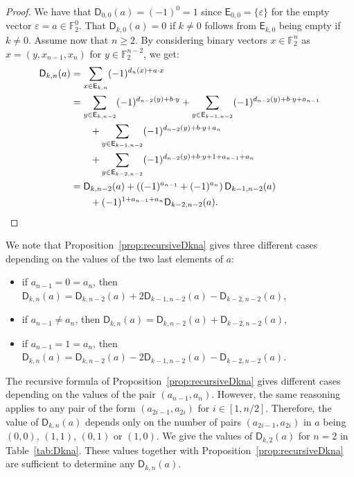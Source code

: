 \documentclass[runningheads,orivec]{llncs}
\newcommand{\Dkna}[3]{\mathsf{D}_{#2,#1}(a)}
\newcommand{\Ekn}[2]{\mathsf{E}_{#1,#2}}
\newcommand{\F}{\mathbb{F}}
\let\geq=\geqslant
\begin{document}
    \begin{proof}
        We have that $\Dkna 00a=(-1)^0=1$ since $\Ekn 00=\{\varepsilon\}$ for the empty vector $\varepsilon=a\in\F_2^0$. That $\Dkna 0ka=0$ if $k\neq 0$ follows from $\Ekn k0$ being empty if $k\neq 0$. Assume now that $n\geq 2$. By considering binary vectors $x\in\F_2^n$ as $x=(y,x_{n-1},x_n)$ for $y\in\F_2^{n-2}$, we get:
        \begin{align*}
    		\Dkna{n}{k}{a}&=\sum_{x\in \Ekn{k}{n}} (-1)^{d_n(x) +a\cdot x}\\
    		&=\sum_{y\in \Ekn{k}{n-2}} (-1)^{d_{n-2}(y) +b\cdot y}+
    		\sum_{y\in \Ekn{k-1}{n-2}} (-1)^{d_{n-2}(y) +b\cdot y + a_{n-1}}\\
    		&\qquad+\sum_{y\in \Ekn{k-1}{n-2}} (-1)^{d_{n-2}(y) +b\cdot y + a_{n}}\\
    		&\qquad+\sum_{y\in \Ekn{k-2}{n-2}} (-1)^{d_{n-2}(y) +b\cdot y +1 + a_{n-1}+ a_{n}}\\
    		&=\Dkna{n-2}{k}{b}+\left((-1)^{a_{n-1}}+ (-1)^{a_{n}}\right)\Dkna{n-2}{k-1}{b}\\
    		&\qquad+ (-1)^{1+a_{n-1}+a_n} \Dkna{n-2}{k-2}{b}.\qedhere
        \end{align*}
    \end{proof}
    
    \begin{remark}
        We note that Proposition~\ref{prop:recursiveDkna} gives three different cases depending on the values of the two last elements of $a$:
    	\begin{itemize}
    		\item if $a_{n-1}=0=a_n$, then $\Dkna{n}{k}{a}=\Dkna{n-2}{k}{b}+2\Dkna{n-2}{k-1}{b}-\Dkna{n-2}{k-2}{b}$,
    		\item if $a_{n-1} \ne a_n$, then $\Dkna{n}{k}{a}=\Dkna{n-2}{k}{b}+\Dkna{n-2}{k-2}{b}$,
    		\item if $a_{n-1}=1=a_n$, then $\Dkna{n}{k}{a}=\Dkna{n-2}{k}{b}-2\Dkna{n-2}{k-1}{b}-\Dkna{n-2}{k-2}{b}$.
    	\end{itemize}
    \end{remark}
    
    \begin{remark}\label{rmk:dependence_Dkna}
        The recursive formula of Proposition~\ref{prop:recursiveDkna} gives different cases depending on the values of the pair $(a_{n-1},a_n)$. However, the same reasoning applies to any pair of the form $(a_{2i-1}, a_{2i})$ for $i\in[1,n/2]$. Therefore, the value of $\Dkna{n}{k}{a}$ depends only on the number of pairs $(a_{2i-1}, a_{2i})$ in $a$ being $(0,0)$, $(1,1)$, $(0,1)$ or $(1,0)$. We give the values of $\Dkna{2}{k}{a}$ for $n=2$ in Table~\ref{tab:Dkna}. These values together with Proposition~\ref{prop:recursiveDkna} are sufficient to determine any $\Dkna{n}{k}{a}$.
    \end{remark}
    
\end{document}
